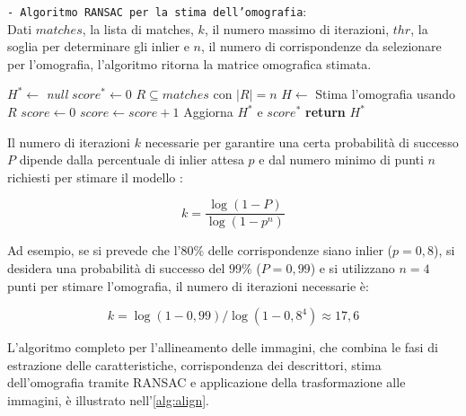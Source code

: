 \begin{algorithm}[H]
    \caption{\texttt{- Algoritmo RANSAC per la stima dell'omografia}:\\ Dati $matches$, la lista di matches, $k$, il numero massimo di iterazioni, $thr$, la soglia per determinare gli inlier e $n$, il numero di corrispondenze da selezionare per l'omografia, l'algoritmo ritorna la matrice omografica stimata.} \label{alg:ransac}
    \begin{algorithmic}[1]
            \State $H^* \gets$ \textit{null} 
            \State $score^* \gets 0$ 
                \State $R \subseteq matches$ con $|R| = n$ 
                \State $H \gets$ Stima l'omografia usando $R$
                \State $score \gets 0$
                     
                        \State $score \gets score + 1$ 
                    \EndIf
                \EndFor
                 
                    \State Aggiorna $H^*$ e $score^*$
                \EndIf
            \EndFor
            \State \textbf{return} $H^*$
        \EndFunction
    \end{algorithmic}
\end{algorithm}

Il numero di iterazioni $k$ necessarie per garantire una certa probabilità di successo $P$ dipende dalla percentuale di inlier attesa $p$ e dal numero minimo di punti $n$ richiesti per stimare il modello \cite{raguram_ransac_parameters}:

$$
k = \dfrac{\log(1 - P)}{\log(1 - p^n)}
$$

Ad esempio, se si prevede che l'$80\%$ delle corrispondenze siano inlier ($p=0,8$), si desidera una probabilità di successo del $99\%$ ($P=0,99$) e si utilizzano $n=4$ punti per stimare l'omografia, il numero di iterazioni necessarie è:

$$
k = {\log(1 - 0{,}99)}/{\log(1 - 0{,}8^4)} \approx 17{,}6
$$

L'algoritmo completo per l'allineamento delle immagini, che combina le fasi di estrazione delle caratteristiche, corrispondenza dei descrittori, stima dell'omografia tramite RANSAC e applicazione della trasformazione alle immagini, è illustrato nell'\cref{alg:align}.

